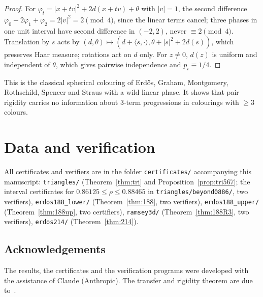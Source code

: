 \documentclass[11pt]{amsart}
\theoremstyle{definition}
\begin{document}
\begin{proof}
For $\varphi_t=|x+tv|^2+2d(x+tv)+\theta$ with $|v|=1$, the second difference $\varphi_0-2\varphi_1+\varphi_2=2|v|^2=2\pmod4$, since the linear terms cancel; three phases in one unit interval have second difference in $(-2,2)$, never $\equiv2\pmod 4$. Translation by $s$ acts by $(d,\theta)\mapsto(d+\langle s,\cdot\rangle,\theta+|s|^2+2d(s))$, which preserves Haar measure; rotations act on $d$ only. For $z\ne0$, $d(z)$ is uniform and independent of $\theta$, which gives pairwise independence and $p_i\equiv1/4$.
\end{proof}

This is the classical spherical colouring of Erd\H{o}s, Graham, Montgomery, Rothschild, Spencer and Straus with a wild linear phase. It shows that pair rigidity carries no information about $3$-term progressions in colourings with $\ge3$ colours.

\section*{Data and verification}
All certificates and verifiers are in the folder \texttt{certificates/} accompanying this manuscript: \texttt{triangles/} (Theorem~\ref{thm:tri} and Proposition~\ref{prop:tri567}; the interval certificates for $0.86125\le\rho\le0.88465$ in \texttt{triangles/beyond0886/}, two verifiers), \texttt{erdos188\_lower/} (Theorem~\ref{thm:188}, two verifiers), \texttt{erdos188\_upper/} (Theorem~\ref{thm:188up}, two certifiers), \texttt{ramsey3d/} (Theorem~\ref{thm:188R3}, two verifiers), \texttt{erdos214/} (Theorem~\ref{thm:214}).

\subsection*{Acknowledgements}
The results, the certificates and the verification programs were developed with the assistance of Claude (Anthropic). The transfer and rigidity theorem are due to~\cite{OAI}.
\end{document}

